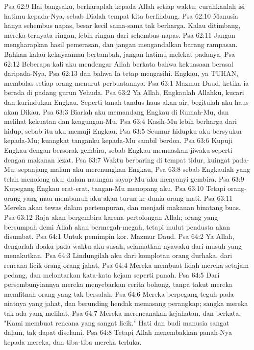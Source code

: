 Psa 62:9  Hai bangsaku, berharaplah kepada Allah setiap waktu; curahkanlah isi hatimu kepada-Nya, sebab Dialah tempat kita berlindung.
Psa 62:10  Manusia hanya sehembus napas, besar kecil sama-sama tak berharga. Kalau ditimbang, mereka ternyata ringan, lebih ringan dari sehembus napas.
Psa 62:11  Jangan mengharapkan hasil pemerasan, dan jangan mengandalkan barang rampasan. Bahkan kalau kekayaanmu bertambah, jangan hatimu melekat padanya.
Psa 62:12  Beberapa kali aku mendengar Allah berkata bahwa kekuasaan berasal daripada-Nya,
Psa 62:13  dan bahwa Ia tetap mengasihi. Engkau, ya TUHAN, membalas setiap orang menurut perbuatannya.
Psa 63:1  Mazmur Daud, ketika ia berada di padang gurun Yehuda.
Psa 63:2  Ya Allah, Engkaulah Allahku, kucari dan kurindukan Engkau. Seperti tanah tandus haus akan air, begitulah aku haus akan Dikau.
Psa 63:3  Biarlah aku memandang Engkau di Rumah-Mu, dan melihat kekuatan dan keagungan-Mu.
Psa 63:4  Kasih-Mu lebih berharga dari hidup, sebab itu aku memuji Engkau.
Psa 63:5  Seumur hidupku aku bersyukur kepada-Mu; kuangkat tanganku kepada-Mu sambil berdoa.
Psa 63:6  Kupuji Engkau dengan bersorak gembira, sebab Engkau memuaskan jiwaku seperti dengan makanan lezat.
Psa 63:7  Waktu berbaring di tempat tidur, kuingat pada-Mu; sepanjang malam aku merenungkan Engkau,
Psa 63:8  sebab Engkaulah yang telah menolong aku; dalam naungan sayap-Mu aku menyanyi gembira.
Psa 63:9  Kupegang Engkau erat-erat, tangan-Mu menopang aku.
Psa 63:10  Tetapi orang-orang yang mau membunuh aku akan turun ke dunia orang mati.
Psa 63:11  Mereka akan tewas dalam pertempuran, dan menjadi makanan binatang buas.
Psa 63:12  Raja akan bergembira karena pertolongan Allah; orang yang bersumpah demi Allah akan bermegah-megah, tetapi mulut pendusta akan disumbat.
Psa 64:1  Untuk pemimpin kor. Mazmur Daud.
Psa 64:2  Ya Allah, dengarlah doaku pada waktu aku susah, selamatkan nyawaku dari musuh yang menakutkan.
Psa 64:3  Lindungilah aku dari komplotan orang durhaka, dari rencana licik orang-orang jahat.
Psa 64:4  Mereka membuat lidah mereka setajam pedang, dan melontarkan kata-kata kejam seperti panah.
Psa 64:5  Dari persembunyiannya mereka menyebarkan cerita bohong, tanpa takut mereka memfitnah orang yang tak bersalah.
Psa 64:6  Mereka berpegang teguh pada niatnya yang jahat, dan berunding hendak memasang perangkap; sangka mereka tak ada yang melihat.
Psa 64:7  Mereka merencanakan kejahatan, dan berkata, "Kami membuat rencana yang sangat licik." Hati dan budi manusia sangat dalam, tak dapat diselami.
Psa 64:8  Tetapi Allah menembakkan panah-Nya kepada mereka, dan tiba-tiba mereka terluka.
